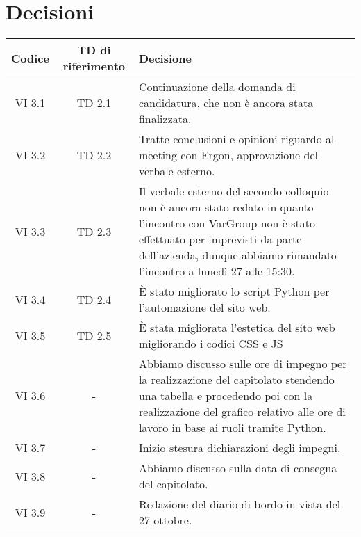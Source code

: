 \section{Decisioni}

	\begin{table}[htbp]
		\begin{tabular}{|c|c|p{}|}
			\hline
			\rowcolor[gray]{0.9}
			Codice & TD di riferimento & Decisione \\
                             \hline
			VI 3.1 & TD 2.1 & Continuazione della domanda di candidatura, che non è ancora stata finalizzata.\\
			\hline
			VI 3.2 & TD 2.2 & Tratte conclusioni e opinioni riguardo al meeting con Ergon, approvazione del verbale esterno.\\
			\hline
			VI 3.3 & TD 2.3 & Il verbale esterno del secondo colloquio non è ancora stato redato in quanto l'incontro con VarGroup non è stato effettuato per imprevisti da parte dell'azienda, dunque abbiamo rimandato l'incontro a lunedì 27 alle 15:30. \\
            \hline
			VI 3.4 & TD 2.4 & È stato migliorato lo script Python per l'automazione del sito web.\\
            \hline
			VI 3.5 & TD 2.5 & È stata migliorata l'estetica del sito web migliorando i codici CSS e JS \\
			\hline
			VI 3.6 & - & Abbiamo discusso sulle ore di impegno per la realizzazione del capitolato stendendo una tabella e procedendo poi con la realizzazione del grafico relativo alle ore di lavoro in base ai ruoli tramite Python.\\
			\hline
			VI 3.7 & - & Inizio stesura dichiarazioni degli impegni.\\
			\hline
			VI 3.8 & - &  Abbiamo discusso sulla data di consegna del capitolato.\\
			\hline
			VI 3.9 & - &  Redazione del diario di bordo in vista del 27 ottobre.\\
			\hline
		\end{tabular}
	\end{table}